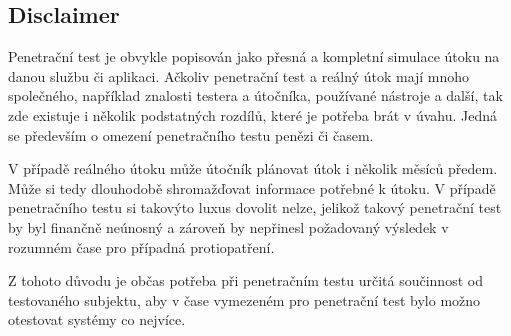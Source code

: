 \subsection{Disclaimer}
Penetrační test je obvykle popisován jako přesná a kompletní simulace útoku na danou službu či aplikaci. Ačkoliv penetrační test a reálný útok mají mnoho společného, například znalosti testera a útočníka, používané nástroje a další, tak zde existuje i několik podstatných rozdílů, které je potřeba brát v úvahu. Jedná se především o omezení penetračního testu penězi či časem.

V případě reálného útoku může útočník plánovat útok i několik měsíců předem. Může si tedy dlouhodobě shromažďovat informace potřebné k útoku. V případě penetračního testu si takovýto luxus dovolit nelze, jelikož takový penetrační test by byl finančně neúnosný a zároveň by nepřinesl požadovaný výsledek v rozumném čase pro případná protiopatření.

Z tohoto důvodu je občas potřeba při penetračním testu určitá součinnost od testovaného subjektu, aby v čase vymezeném pro penetrační test bylo možno otestovat systémy co nejvíce.

